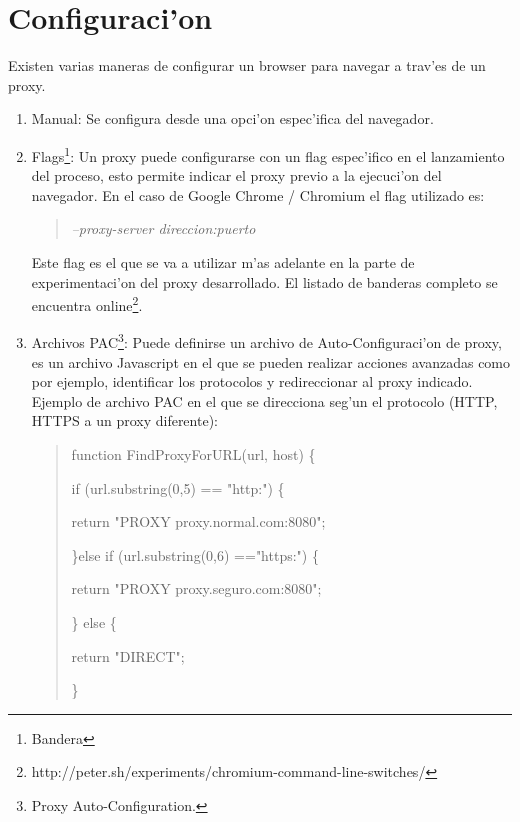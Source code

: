\section{Configuraci'on}
\label{proxyConf}
Existen varias maneras de configurar un browser para navegar a trav'es de un proxy.
\begin{enumerate}
\item Manual: Se configura desde una opci'on espec'ifica del navegador.
\item Flags\footnote{Bandera}: Un proxy puede configurarse con un flag espec'ifico en el lanzamiento del proceso, esto permite indicar el proxy previo a la ejecuci'on del navegador. En el caso de Google Chrome / Chromium el flag utilizado es:
\begin{quote}
\textit{--proxy-server direccion:puerto}
\end{quote}
Este flag es el que se va a utilizar m'as adelante en la parte de experimentaci'on del proxy desarrollado. El listado de banderas completo se encuentra online\footnote{http://peter.sh/experiments/chromium-command-line-switches/}.
\item Archivos PAC\footnote{Proxy Auto-Configuration.}: Puede definirse un archivo de Auto-Configuraci'on de proxy, es un archivo Javascript en el que se pueden realizar acciones avanzadas como por ejemplo, identificar los protocolos y redireccionar al proxy indicado. Ejemplo de archivo PAC en el que se direcciona seg'un el protocolo (HTTP, HTTPS a un proxy diferente):
\begin{quote}
function FindProxyForURL(url, host) \{

\hspace{1cm}if (url.substring(0,5) == "http:") \{

        \hspace{2cm}return "PROXY proxy.normal.com:8080";
        
\hspace{1cm}\}else if (url.substring(0,6) =="https:") \{

	\hspace{2cm}return "PROXY proxy.seguro.com:8080";
	
\hspace{1cm}\} else \{

        \hspace{2cm}return "DIRECT";
        
    \}
\end{quote}
\end{enumerate}
